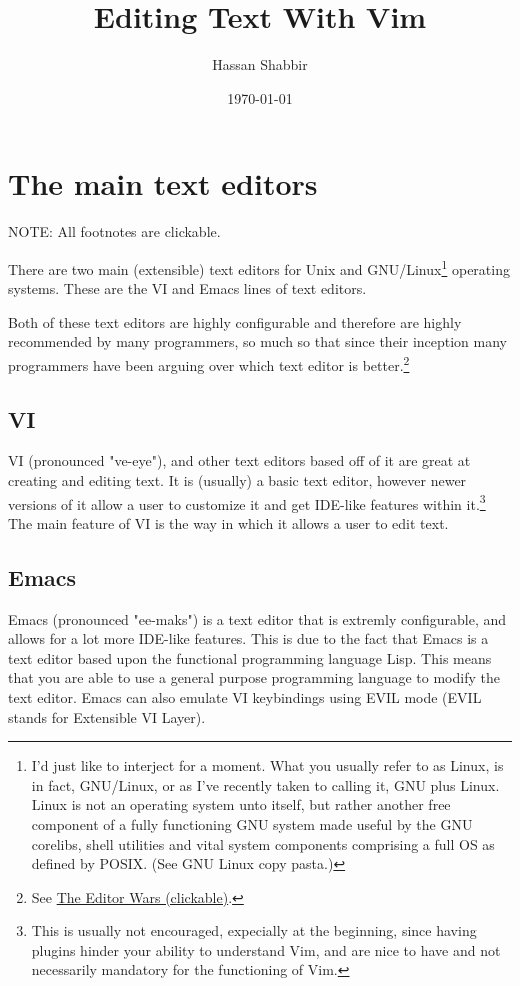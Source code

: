 \documentclass[11pt]{article}
\author{Hassan Shabbir}
\date{\today}
\title{Editing Text With Vim}
\begin{document}
\maketitle
\tableofcontents

\newpage
\section{The main text editors}
\label{sec:orga98c7cc}
NOTE: All footnotes are clickable.

There are two main (extensible) text editors for Unix and GNU/Linux\footnote{I'd just like to interject for a moment. What you usually refer to as Linux, is
in fact, GNU/Linux, or as I've recently taken to calling it, GNU plus Linux.
Linux is not an operating system unto itself, but rather another free component
of a fully functioning GNU system made useful by the GNU corelibs, shell
utilities and vital system components comprising a full OS as defined by POSIX.
(See GNU Linux copy pasta.)}
operating systems. These are the VI and Emacs lines of text editors.

Both of these text editors are highly configurable and therefore are highly
recommended by many programmers, so much so that since their inception many
programmers have been arguing over which text editor is better.\footnote{See \href{https://en.wikipedia.org/wiki/Editor\_war}{The Editor Wars (clickable)}.}
\subsection{VI}
\label{sec:org1271e01}
VI (pronounced "ve-eye"), and other text editors based off of it are great at
creating and editing text. It is (usually) a basic text editor, however newer
versions of it allow a user to customize it and get IDE-like features within
it.\footnote{This is usually not encouraged, expecially at the beginning, since
having plugins hinder your ability to understand Vim, and are nice to have
and not necessarily mandatory for the functioning of Vim.} The main feature of VI is the way in which it allows a user to edit
text.
\subsection{Emacs}
\label{sec:org2093792}
Emacs (pronounced "ee-maks") is a text editor that is extremly configurable, and
allows for a lot more IDE-like features. This is due to the fact that Emacs is a
text editor based upon the functional programming language Lisp. This means that
you are able to use a general purpose programming language to modify the text
editor. Emacs can also emulate VI keybindings using EVIL mode (EVIL stands for
Extensible VI Layer).
\end{document}
